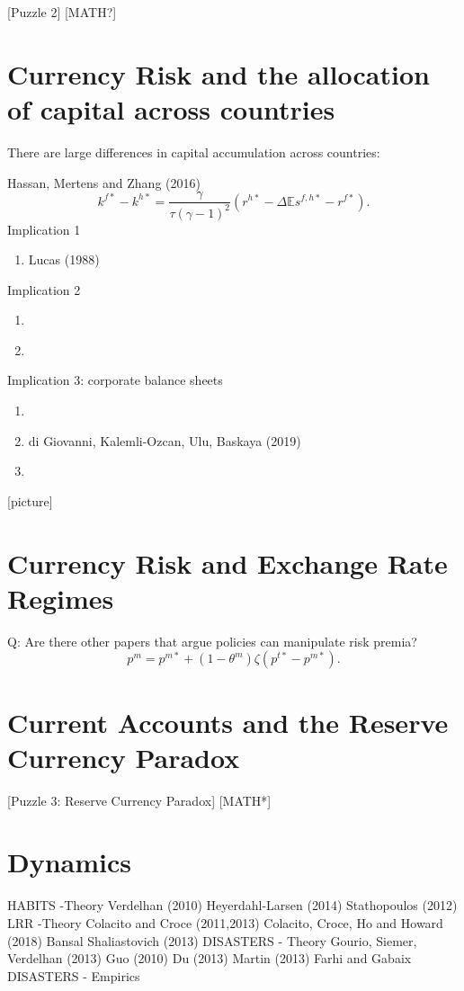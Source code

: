 \documentclass{ar-1col}
\begin{document}
[Puzzle 2] [MATH?]

\section{Currency Risk and the allocation of capital across countries}
There are large differences in capital accumulation across countries:

Hassan, Mertens and Zhang (2016)
\begin{equation}\label{eq_link_k_r}
  k^{f\ast}-k^{h\ast} = \frac{\gamma}{\tau(\gamma-1)^2}\left(r^{h \ast} - \Delta \mathbb{E} s^{f, h \ast} - r^{f \ast}\right).
\end{equation}
Implication 1
\begin{enumerate}
\item Lucas (1988)
\end{enumerate}
Implication 2
\begin{enumerate}
\item \citet{CaselliFeyrer2007}
\item \citet{Monge-Naranjo2019}
\end{enumerate}
Implication 3: corporate balance sheets
\begin{enumerate}
\item \citet{Richers2019}
\item di Giovanni, Kalemli-Ozcan, Ulu, Baskaya (2019)
\item \citet{DavidHenriksenSimonovska2014}
\end{enumerate} [picture]
\section{Currency Risk and Exchange Rate Regimes}
Q: Are there other papers that argue policies can manipulate risk
premia?
\begin{equation*}
  p^m = p^{m \ast} + (1 - \theta^m) \zeta (p^{t \ast} - p^{m \ast}).
\end{equation*}
\section{Current Accounts and the Reserve Currency Paradox}
[Puzzle 3: Reserve Currency Paradox] [MATH*]

\section{Dynamics}

HABITS -Theory Verdelhan (2010) Heyerdahl-Larsen (2014) Stathopoulos
(2012) LRR -Theory Colacito and Croce (2011,2013) Colacito, Croce, Ho
and Howard (2018) Bansal Shaliastovich (2013) DISASTERS - Theory
Gourio, Siemer, Verdelhan (2013) Guo (2010) Du (2013) Martin (2013)
Farhi and Gabaix DISASTERS - Empirics
\end{document}
